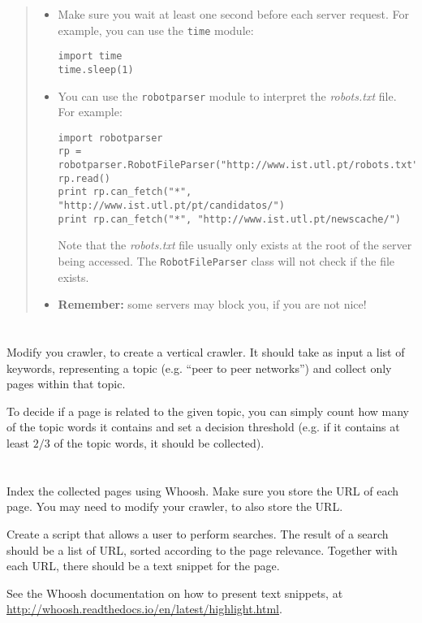 \documentclass[12pt]{article}
\begin{document}
\begin{quote}
\begin{itemize}
    \item Make sure you wait at least one second before each server
        request. For example, you can use the \texttt{time} module:
\begin{verbatim}
import time
time.sleep(1)
\end{verbatim}
    \item You can use the \texttt{robotparser} module to interpret the
        \emph{robots.txt} file. For example:
\begin{verbatim}
import robotparser
rp = robotparser.RobotFileParser("http://www.ist.utl.pt/robots.txt")
rp.read()
print rp.can_fetch("*", "http://www.ist.utl.pt/pt/candidatos/")
print rp.can_fetch("*", "http://www.ist.utl.pt/newscache/")
\end{verbatim}
        Note that the \emph{robots.txt} file usually only exists at the root of
        the server being accessed. The \texttt{RobotFileParser} class will not
        check if the file exists.
    \item \textbf{Remember:} some servers may block you, if you are not nice!
    \end{itemize}
\end{quote}


\section{}

Modify you crawler, to create a vertical crawler. It should take as input a
list of keywords, representing a topic (e.g. ``peer to peer networks'') and
collect only pages within that topic.

To decide if a page is related to the given topic, you can simply count how
many of the topic words it contains and set a decision threshold (e.g. if it
contains at least $2/3$ of the topic words, it should be collected).

\section{}

Index the collected pages using Whoosh. Make sure you store the URL of each
page. You may need to modify your crawler, to also store the URL. 

Create a script that allows a user to perform searches. The result of a search
should be a list of URL, sorted according to the page relevance. Together with
each URL, there should be a text snippet for the page. 

See the Whoosh documentation on how to present text snippets, at
\url{http://whoosh.readthedocs.io/en/latest/highlight.html}.
\end{document}
